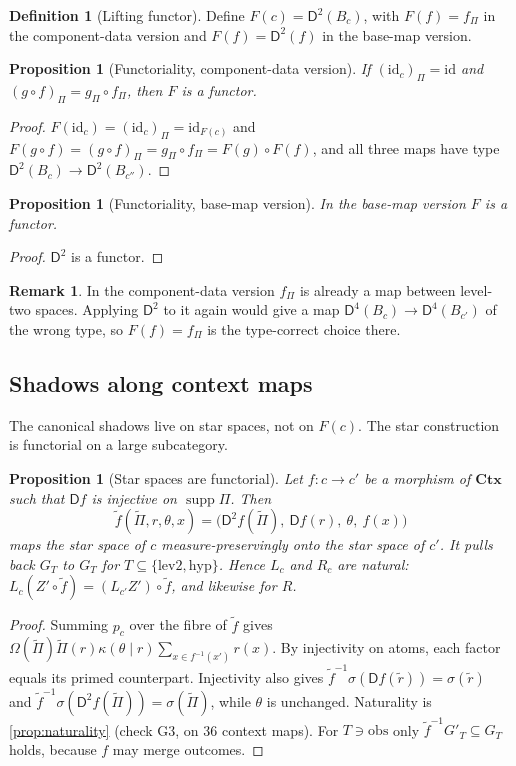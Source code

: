 \documentclass[11pt]{article}
\newtheorem{proposition}[theorem]{Proposition}
\theoremstyle{definition}
\newtheorem{definition}[theorem]{Definition}
\newtheorem{remark}[theorem]{Remark}
\newcommand{\D}{\mathsf D}
\newcommand{\id}{\mathrm{id}}
\newcommand{\Pt}{\widetilde\Pi}
\newcommand{\rr}{\tilde r}
\newcommand{\Ctx}{\mathbf{Ctx}}
\begin{document}
\begin{definition}[Lifting functor]
Define $F(c)=\D^2(B_c)$, with $F(f)=f_\Pi$ in the component-data version and $F(f)=\D^2(f)$ in the base-map version.
\end{definition}

\begin{proposition}[Functoriality, component-data version]\label{prop:functor-component}
If $(\id_c)_\Pi=\id$ and $(g\circ f)_\Pi=g_\Pi\circ f_\Pi$, then $F$ is a functor.
\end{proposition}
\begin{proof}
$F(\id_c)=(\id_c)_\Pi=\id_{F(c)}$ and $F(g\circ f)=(g\circ f)_\Pi=g_\Pi\circ f_\Pi=F(g)\circ F(f)$, and all three maps have type
$\D^2(B_c)\to\D^2(B_{c''})$.
\end{proof}

\begin{proposition}[Functoriality, base-map version]\label{prop:functor-base}
In the base-map version $F$ is a functor.
\end{proposition}
\begin{proof}
$\D^2$ is a functor.
\end{proof}

\begin{remark}
In the component-data version $f_\Pi$ is already a map between level-two spaces. Applying $\D^2$ to it again would give a map
$\D^4(B_c)\to\D^4(B_{c'})$ of the wrong type, so $F(f)=f_\Pi$ is the type-correct choice there.
\end{remark}

\subsection{Shadows along context maps}
The canonical shadows live on star spaces, not on $F(c)$. The star construction is functorial on a large subcategory.

\begin{proposition}[Star spaces are functorial]\label{prop:star-functor}
Let $f\colon c\to c'$ be a morphism of $\Ctx$ such that $\D f$ is injective on $\operatorname{supp}\Pi$. Then
\[
\tilde f(\Pt,r,\theta,x)=\big(\D^2f(\Pt),\ \D f(r),\ \theta,\ f(x)\big)
\]
maps the star space of $c$ measure-preservingly onto the star space of $c'$. It pulls back $G_T$ to $G_T$ for
$T\subseteq\{\mathrm{lev2},\mathrm{hyp}\}$. Hence $L_c$ and $R_c$ are natural:
$L_c(Z'\circ\tilde f)=(L_{c'}Z')\circ\tilde f$, and likewise for $R$.
\end{proposition}
\begin{proof}
Summing $p_c$ over the fibre of $\tilde f$ gives $\Omega(\Pt)\Pt(r)\kappa(\theta\mid r)\sum_{x\in f^{-1}(x')}r(x)$. By injectivity on
atoms, each factor equals its primed counterpart. Injectivity also gives $\tilde f^{-1}\sigma(\D f(\rr))=\sigma(\rr)$ and
$\tilde f^{-1}\sigma(\D^2f(\Pt))=\sigma(\Pt)$, while $\theta$ is unchanged. Naturality is \cref{prop:naturality} (check G3, on 36 context
maps). For $T\ni\mathrm{obs}$ only $\tilde f^{-1}G'_T\subseteq G_T$ holds, because $f$ may merge outcomes.
\end{proof}
\end{document}

